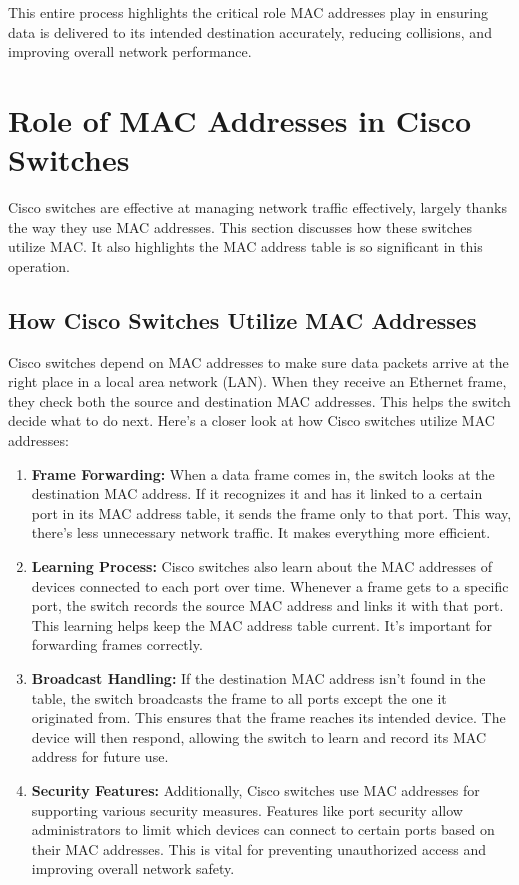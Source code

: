 \documentclass[11pt,a4paper]{article}
\begin{document}
This entire process highlights the critical role MAC addresses play in ensuring data is delivered to its intended destination accurately, reducing collisions, and improving overall network performance.


\section*{Role of MAC Addresses in Cisco Switches}

Cisco switches are effective at managing network traffic effectively, largely thanks the way they use MAC addresses. This section discusses how these switches utilize MAC. It also highlights the MAC address table is so significant in this operation.


\subsection*{How Cisco Switches Utilize MAC Addresses}

Cisco switches depend on MAC addresses to make sure data packets arrive at the right place in a local area network (LAN). When they receive an Ethernet frame, they check both the source and destination MAC addresses. This helps the switch decide what to do next. Here’s a closer look at how Cisco switches utilize MAC addresses:

\begin{enumerate}
    \item \textbf{Frame Forwarding:} When a data frame comes in, the switch looks at the destination MAC address. If it recognizes it and has it linked to a certain port in its MAC address table, it sends the frame only to that port. This way, there's less unnecessary network traffic. It makes everything more efficient.

    \item \textbf{Learning Process:} Cisco switches also learn about the MAC addresses of devices connected to each port over time. Whenever a frame gets to a specific port, the switch records the source MAC address and links it with that port. This learning helps keep the MAC address table current. It's important for forwarding frames correctly.

    \item \textbf{Broadcast Handling:} If the destination MAC address isn’t found in the table, the switch broadcasts the frame to all ports except the one it originated from. This ensures that the frame reaches its intended device. The device will then respond, allowing the switch to learn and record its MAC address for future use.

    \item \textbf{Security Features:} Additionally, Cisco switches use MAC addresses for supporting various security measures. Features like port security allow administrators to limit which devices can connect to certain ports based on their MAC addresses. This is vital for preventing unauthorized access and improving overall network safety.

\end{enumerate}
\end{document}
